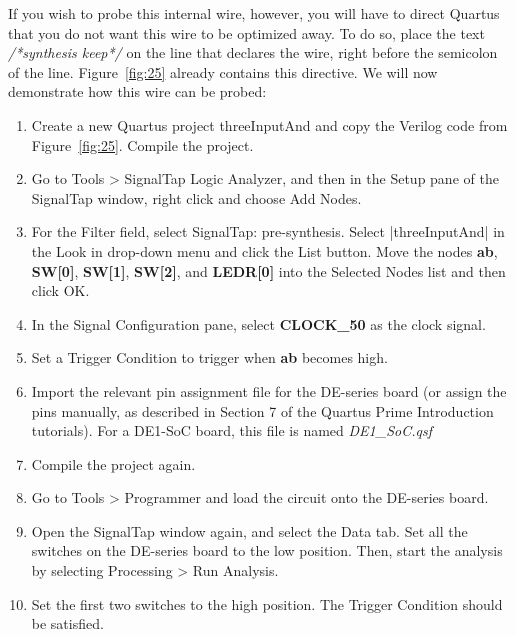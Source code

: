 \documentclass[11pt, twoside, pdftex]{article}
\newcommand{\commonPath}{../../../Common}
\begin{document}
If you wish to probe this internal wire, however, you will have to direct Quartus that you do not want this wire to be optimized away.
To do so, place the text {\it /*synthesis keep*/} on the line that declares the wire, right before the semicolon of the line.
Figure~\ref{fig:25} already contains this directive. We will now demonstrate how this wire can be probed:

\begin{enumerate}
\item Create a new Quartus project threeInputAnd and copy the Verilog code from Figure~\ref{fig:25}. Compile the project.
\item Go to {\sf Tools > SignalTap Logic Analyzer}, and then in the Setup pane of the SignalTap window, right click
and choose {\sf Add Nodes}.
\item For the {\sf Filter} field, select {\sf SignalTap: pre-synthesis}. Select {\sf |threeInputAnd|} in the {\sf Look in} drop-down menu and click the {\sf List} button. Move the nodes {\bf ab}, {\bf SW[0]}, {\bf SW[1]}, {\bf SW[2]}, and {\bf LEDR[0]} into the Selected Nodes list and then click {\sf OK}.
\item In the Signal Configuration pane, select {\bf CLOCK\_50} as the clock signal.
\item Set a Trigger Condition to trigger when {\bf ab} becomes high.
\item Import the relevant pin assignment file for the DE-series board (or assign the pins manually, as described in Section 7 of the Quartus Prime Introduction tutorials). For a DE1-SoC board, this file is named {\it DE1\_SoC.qsf}
\item Compile the project again.
\item Go to {\sf Tools > Programmer} and load the circuit onto the DE-series board.
\item Open the SignalTap window again, and select the Data tab. Set all the switches on the DE-series board to the low position. Then, start the analysis by selecting {\sf Processing > Run Analysis}.
\item Set the first two switches to the high position. The Trigger Condition should be satisfied.
\end{enumerate}




\end{document}
